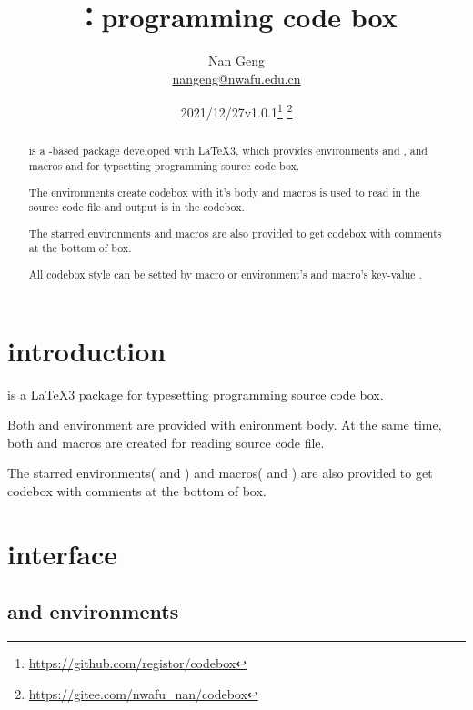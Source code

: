 \documentclass{ctxdoc-en}
\title{\bfseries\pkg{codebox}：programming code box}
\author{Nan Geng\\ \url{nangeng@nwafu.edu.cn}}
\date{2021/12/27\qquad v1.0.1\thanks{\url{https://github.com/registor/codebox}}
\thanks{\url{https://gitee.com/nwafu_nan/codebox}}}
\begin{document}
\maketitle

\begin{abstract}

 is a -based package developed with \LaTeX3,
which provides environments  and , and macros
 and  for typsetting programming source code box.

The environments create codebox with it's body and
macros is used to read in the source code file and output is in the codebox.

The starred environments and macros are also provided
to get codebox with comments at the bottom of box.

All codebox style can be setted by  macro
or environment's and macro's key-value .

\end{abstract}

\tableofcontents

\section{introduction}

 is a \LaTeX3 package for typesetting programming source code box.

Both  and  environment are provided with enironment body.
At the same time, both  and  macros are created
for reading source code file.

The starred environments( and ) and
macros( and ) are also provided
to get codebox with comments at the bottom of box.

\section{interface}

\subsection{ and  environments}
\end{document}
